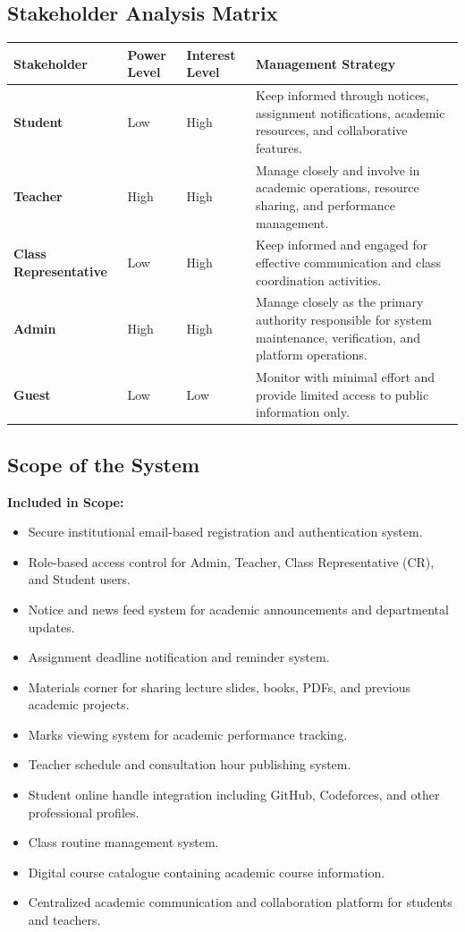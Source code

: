 \documentclass[12pt,a4paper]{article}
\newcommand{\THH}[1]{\small\bfseries\color{white} #1}
\begin{document}
\subsection{Stakeholder Analysis Matrix}

\vspace{0.6em}
\begin{longtable}{|>{\bfseries\small}p{3.5cm}|p{3cm}|p{3cm}|p{5.2cm}|}
\hline
\rowcolor{navyblue}
\THH{Stakeholder} & \THH{Power Level} & \THH{Interest Level} & \THH{Management Strategy} \\
\hline
\endhead
Student & Low & High & Keep informed through notices, assignment notifications, academic resources, and collaborative features. \\
\hline
Teacher & High & High & Manage closely and involve in academic operations, resource sharing, and performance management. \\
\hline
Class Representative & Low & High & Keep informed and engaged for effective communication and class coordination activities. \\
\hline
Admin & High & High & Manage closely as the primary authority responsible for system maintenance, verification, and platform operations. \\
\hline
Guest & Low & Low & Monitor with minimal effort and provide limited access to public information only. \\
\hline
\end{longtable}

\subsection{Scope of the System}

\textbf{Included in Scope:}

\begin{itemize}[leftmargin=*, label=\textbullet]
  \item Secure institutional email-based registration and authentication system.
  \item Role-based access control for Admin, Teacher, Class Representative (CR), and Student users.
  \item Notice and news feed system for academic announcements and departmental updates.
  \item Assignment deadline notification and reminder system.
  \item Materials corner for sharing lecture slides, books, PDFs, and previous academic projects.
  \item Marks viewing system for academic performance tracking.
  \item Teacher schedule and consultation hour publishing system.
  \item Student online handle integration including GitHub, Codeforces, and other professional profiles.
  \item Class routine management system.
  \item Digital course catalogue containing academic course information.
  \item Centralized academic communication and collaboration platform for students and teachers.
\end{itemize}
\end{document}
